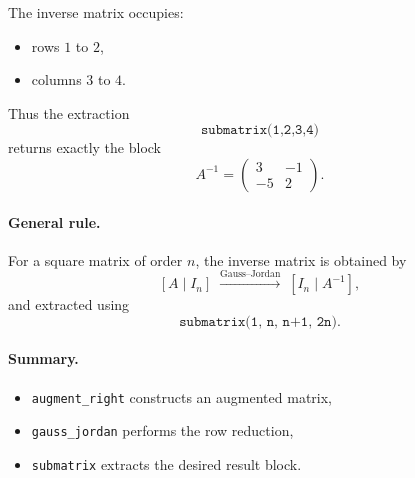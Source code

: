 The inverse matrix occupies:
\begin{itemize}
  \item rows $1$ to $2$,
  \item columns $3$ to $4$.
\end{itemize}

Thus the extraction
\[
\texttt{submatrix(1,2,3,4)}
\]
returns exactly the block
\[
A^{-1} =
\begin{pmatrix}
3 & -1\\
-5 & 2
\end{pmatrix}.
\]

\medskip

\paragraph{General rule.}
For a square matrix of order $n$, the inverse matrix is obtained by
\[
[A \mid I_n]
\;\xrightarrow{\text{Gauss--Jordan}}\;
[I_n \mid A^{-1}],
\]
and extracted using
\[
\texttt{submatrix(1, n, n+1, 2n)}.
\]

\medskip

\paragraph{Summary.}
\begin{itemize}
  \item \texttt{augment\_right} constructs an augmented matrix,
  \item \texttt{gauss\_jordan} performs the row reduction,
  \item \texttt{submatrix} extracts the desired result block.
\end{itemize}

\endinput